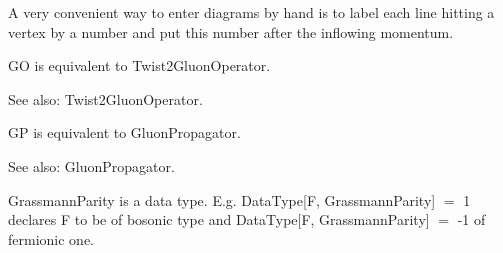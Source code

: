 
A very convenient way to enter diagrams by hand is to label each line hitting a vertex by a number and put this number after the
  inflowing momentum.







GO is equivalent to Twist2GluonOperator.

See also:  Twist2GluonOperator.



GP is equivalent to GluonPropagator.

See also:  GluonPropagator.



GrassmannParity is a data type. E.g. DataType[F, GrassmannParity] \(=\) 1 declares F to be of bosonic type and DataType[F,
  GrassmannParity] \(=\) -1 of fermionic one.

